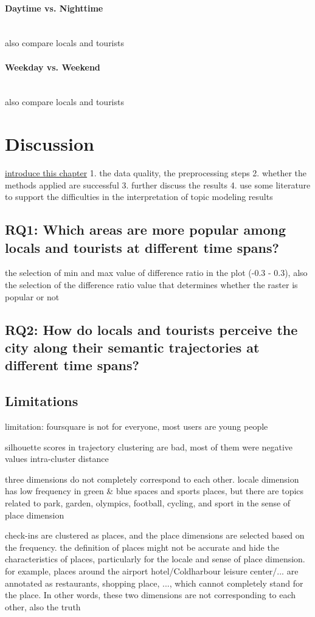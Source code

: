 \documentclass{article}
\newcommand{\subsubsubsection}[1]{\paragraph{#1}\mbox{}\\}
\theoremstyle{remark}
\begin{document}
\subsubsubsection{Daytime vs. Nighttime}
also compare locals and tourists

\subsubsubsection{Weekday vs. Weekend}
also compare locals and tourists


\clearpage


\section{Discussion}
\underline{introduce this chapter}
1. the data quality, the preprocessing steps
2. whether the methods applied are successful
3. further discuss the results
4. use some literature to support the difficulties in the interpretation of topic modeling results

\subsection{RQ1: Which areas are more popular among locals and tourists at different time spans?}
the selection of min and max value of difference ratio in the plot (-0.3 - 0.3), also the selection of the difference ratio value that determines whether the raster is popular or not

\subsection{RQ2: How do locals and tourists perceive the city along their semantic trajectories at different time spans?}

\subsection{Limitations}
limitation: foursquare is not for everyone, most users are young people

silhouette scores in trajectory clustering are bad, most of them were negative values
intra-cluster distance

three dimensions do not completely correspond to each other. locale dimension has low frequency in green \& blue spaces and sports places, but there are topics related to park, garden, olympics, football, cycling, and sport in the sense of place dimension

check-ins are clustered as places, and the place dimensions are selected based on the frequency. the definition of places might not be accurate and hide the characteristics of places, particularly for the locale and sense of place dimension. for example, places around the airport hotel/Coldharbour leisure center/... are annotated as restaurants, shopping place, ..., which cannot completely stand for the place. In other words, these two dimensions are not corresponding to each other, also the truth
\end{document}
